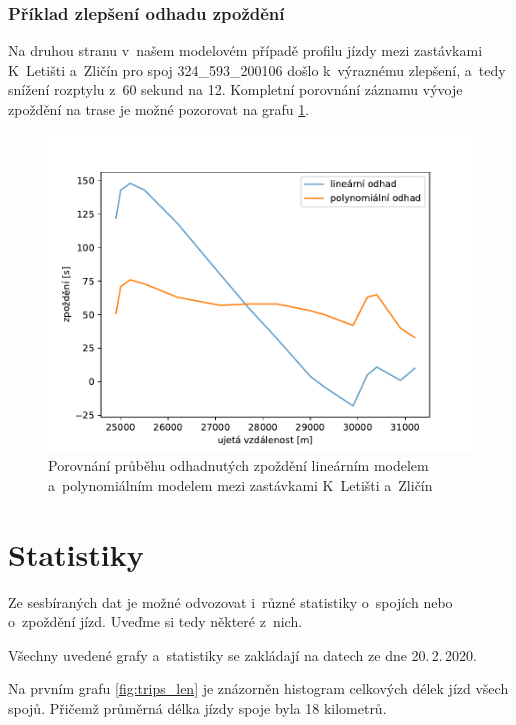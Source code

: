 \subsubsection{Příklad zlepšení odhadu zpoždění}

Na druhou stranu v~našem modelovém případě profilu jízdy mezi zastávkami K~Letišti a~Zličín pro spoj 324\_593\_200106 došlo k~výraznému zlepšení, a~tedy snížení rozptylu z~60 sekund na 12. Kompletní porovnání záznamu vývoje zpoždění na trase je možné pozorovat na grafu \ref{fig:compare_534_421}.


\begin{figure}
   \centering
 \includegraphics[width=1\linewidth]{../img/compare_534_421}
 \caption{Porovnání průběhu odhadnutých zpoždění lineárním modelem a~polynomiálním modelem mezi zastávkami K~Letišti a~Zličín}
 \label{fig:compare_534_421}
\end{figure}


\section{Statistiky} \label{section:stats}

Ze sesbíraných dat je možné odvozovat i~různé statistiky o~spojích nebo o~zpoždění jízd. Uveďme si tedy některé z~nich.

\bigbreak

Všechny uvedené grafy a~statistiky se zakládají na datech ze dne 20.\,2.\,2020.


\bigbreak

Na prvním grafu \ref{fig:trips_len} je znázorněn histogram celkových délek jízd všech spojů. Přičemž průměrná délka jízdy spoje byla 18 kilometrů.

